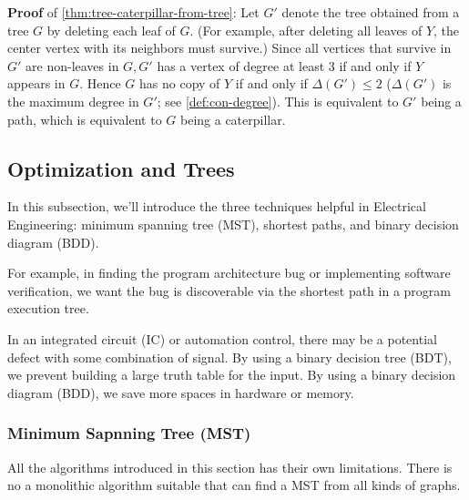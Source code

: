 \documentclass[../src/handouts/main.tex]{subfiles}
\begin{document}
\textbf{Proof} of \cref{thm:tree-caterpillar-from-tree}: Let $G'$ denote the tree obtained from a tree $G$ by deleting each leaf of $G$. (For example, after deleting all leaves of $Y$, the center vertex with its neighbors must survive.) Since all vertices that survive in $G'$ are non-leaves in $G, G'$ has a vertex of degree at least 3 if and only if $Y$ appears in $G$. Hence $G$ has no copy of $Y$ if and only if $\Delta \left( G' \right) \leq 2$ ($\Delta \left( G' \right)$ is the maximum degree in $G'$; see \cref{def:con-degree}). This is equivalent to $G'$ being a path, which is equivalent to $G$ being a caterpillar.


\subsection{Optimization and Trees}

In this subsection, we'll introduce the three techniques helpful in Electrical Engineering: minimum spanning tree (MST), shortest paths, and binary decision diagram (BDD).

\begin{supplement}
  For example, in finding the program architecture bug or implementing software verification, we want the bug is discoverable via the shortest path in a program execution tree.

  In an integrated circuit (IC) or automation control, there may be a potential defect with some combination of signal. By using a binary decision tree (BDT), we prevent building a large truth table for the input. By using a binary decision diagram (BDD), we save more spaces in hardware or memory.
\end{supplement}

\subsubsection{Minimum Sapnning Tree (MST)}

All the algorithms introduced in this section has their own limitations. There is no a monolithic algorithm suitable that can find a MST from all kinds of graphs.
\end{document}
